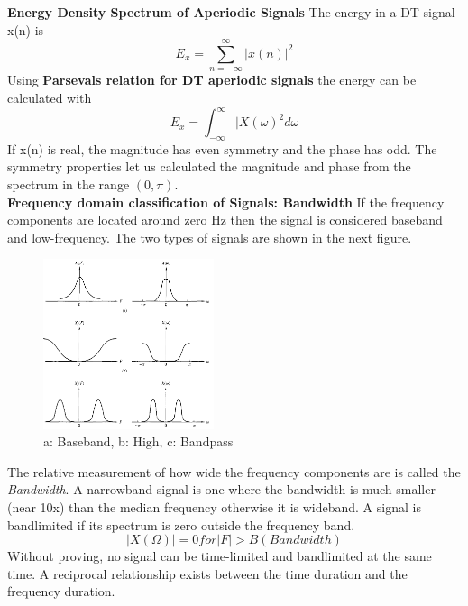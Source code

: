 \documentclass{article} %
\begin{document}
	\textbf{Energy Density Spectrum of Aperiodic Signals}
	The energy in a DT signal x(n) is 
	\begin{equation}
	E_x = \sum_{n = -\infty}^{\infty}|x(n)|^2
	\end{equation}
	Using \textbf{Parsevals relation for DT aperiodic signals} the energy can be calculated with
	\begin{equation}
	E_x = \int_{-\infty}^{\infty}|X(\omega)^2d\omega
	\end{equation}
	If x(n) is real, the magnitude has even symmetry and the phase has odd. The symmetry properties let us calculated the magnitude and phase
	from the spectrum in the range $(0, \pi)$. \\
	\textbf{Frequency domain classification of Signals: Bandwidth}
	If the frequency components are located around zero Hz then the signal is considered baseband and low-frequency. The two types of signals
	are shown in the next figure. 

	\begin{figure}[h]
	\centering
	\includegraphics[width=5cm]{band}
	\caption{a: Baseband, b: High, c: Bandpass}
	\end{figure}
	The relative measurement of how wide the frequency components are is called the \textit{Bandwidth}. A narrowband signal is one
	where the bandwidth is much smaller (near 10x) than the median frequency otherwise it is wideband. A signal is bandlimited if its spectrum is zero outside
	the frequency band. 
	\begin{equation}
	|X(\Omega)| = 0 for |F| > B (Bandwidth)
	\end{equation}
	Without proving, no signal can be time-limited and bandlimited at the same time. A reciprocal relationship exists between the time 
	duration and the frequency duration. 
\end{document}
